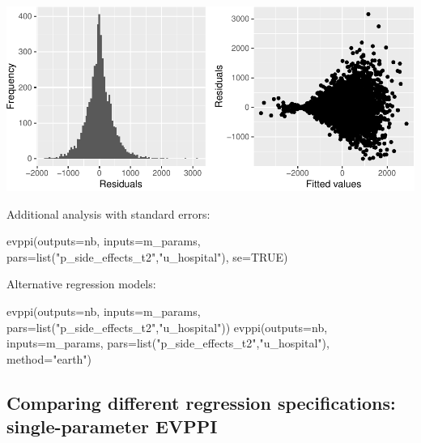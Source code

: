 \documentclass[
]{article}
\newenvironment{Shaded}{\begin{snugshade}}{\end{snugshade}}
\newcommand{\AttributeTok}[1]{\textcolor[rgb]{0.77,0.63,0.00}{#1}}
\newcommand{\ConstantTok}[1]{\textcolor[rgb]{0.00,0.00,0.00}{#1}}
\newcommand{\FunctionTok}[1]{\textcolor[rgb]{0.00,0.00,0.00}{#1}}
\newcommand{\NormalTok}[1]{#1}
\newcommand{\StringTok}[1]{\textcolor[rgb]{0.31,0.60,0.02}{#1}}
\begin{document}
\includegraphics{evppi_reg_files/figure-latex/regression_diagnostics-1.pdf}

Additional analysis with standard errors:

\begin{Shaded}
\begin{Highlighting}[]
\FunctionTok{evppi}\NormalTok{(}\AttributeTok{outputs=}\NormalTok{nb, }\AttributeTok{inputs=}\NormalTok{m\_params, }\AttributeTok{pars=}\FunctionTok{list}\NormalTok{(}\StringTok{"p\_side\_effects\_t2"}\NormalTok{,}\StringTok{"u\_hospital"}\NormalTok{), }\AttributeTok{se=}\ConstantTok{TRUE}\NormalTok{)}
\end{Highlighting}
\end{Shaded}

Alternative regression models:

\begin{Shaded}
\begin{Highlighting}[]
\FunctionTok{evppi}\NormalTok{(}\AttributeTok{outputs=}\NormalTok{nb, }\AttributeTok{inputs=}\NormalTok{m\_params, }\AttributeTok{pars=}\FunctionTok{list}\NormalTok{(}\StringTok{"p\_side\_effects\_t2"}\NormalTok{,}\StringTok{"u\_hospital"}\NormalTok{))}
\FunctionTok{evppi}\NormalTok{(}\AttributeTok{outputs=}\NormalTok{nb, }\AttributeTok{inputs=}\NormalTok{m\_params, }\AttributeTok{pars=}\FunctionTok{list}\NormalTok{(}\StringTok{"p\_side\_effects\_t2"}\NormalTok{,}\StringTok{"u\_hospital"}\NormalTok{), }\AttributeTok{method=}\StringTok{"earth"}\NormalTok{)}
\end{Highlighting}
\end{Shaded}

\hypertarget{comparing-different-regression-specifications-single-parameter-evppi}{%
\subsection{Comparing different regression specifications:
single-parameter
EVPPI}\label{comparing-different-regression-specifications-single-parameter-evppi}}
\end{document}
